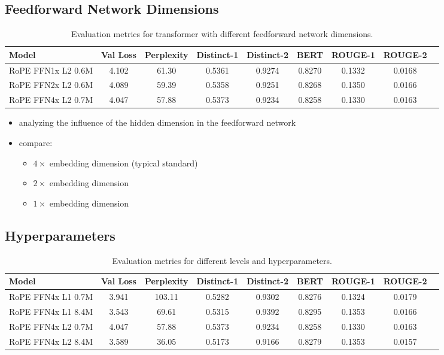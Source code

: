 \subsection*{Feedforward Network Dimensions} \label{subsec:ffn}
\begin{table}[h!]
    \centering
    \begin{tabular}{lcccccccc}
        \hline
        Model              & Val Loss & Perplexity & Distinct-1 & Distinct-2 &   BERT & ROUGE-1 & ROUGE-2\\
        \hline
        RoPE FFN1x L2 0.6M &    4.102 &      61.30 &     0.5361 &     0.9274 & 0.8270 &  0.1332 & 0.0168 \\
        RoPE FFN2x L2 0.6M &    4.089 &      59.39 &     0.5358 &     0.9251 & 0.8268 &  0.1350 & 0.0166 \\
        RoPE FFN4x L2 0.7M &    4.047 &      57.88 &     0.5373 &     0.9234 & 0.8258 &  0.1330 & 0.0163 \\
        \hline
    \end{tabular}
    \caption{Evaluation metrics for transformer with different feedforward network dimensions.}
\end{table}
\begin{itemize}
    \item analyzing the influence of the hidden dimension in the feedforward network
    \item compare:
    \begin{itemize}
        \item $4 \times$ embedding dimension (typical standard)
        \item $2 \times$ embedding dimension
        \item $1 \times$ embedding dimension
    \end{itemize}
\end{itemize}



\subsection*{Hyperparameters} \label{subsec:params}
\begin{table}[h!]
    \centering
    \begin{tabular}{lcccccccc}
        \hline
        Model              & Val Loss & Perplexity & Distinct-1 & Distinct-2 &   BERT & ROUGE-1 & ROUGE-2\\
        \hline
        RoPE FFN4x L1 0.7M &    3.941 &     103.11 &     0.5282 &     0.9302 & 0.8276 &  0.1324 & 0.0179 \\
        RoPE FFN4x L1 8.4M &    3.543 &      69.61 &     0.5315 &     0.9392 & 0.8295 &  0.1353 & 0.0166 \\
        RoPE FFN4x L2 0.7M &    4.047 &      57.88 &     0.5373 &     0.9234 & 0.8258 &  0.1330 & 0.0163 \\
        RoPE FFN4x L2 8.4M &    3.589 &      36.05 &     0.5173 &     0.9166 & 0.8279 &  0.1353 & 0.0157 \\
        \hline
    \end{tabular}
    \caption{Evaluation metrics for different levels and hyperparameters.}
\end{table}

